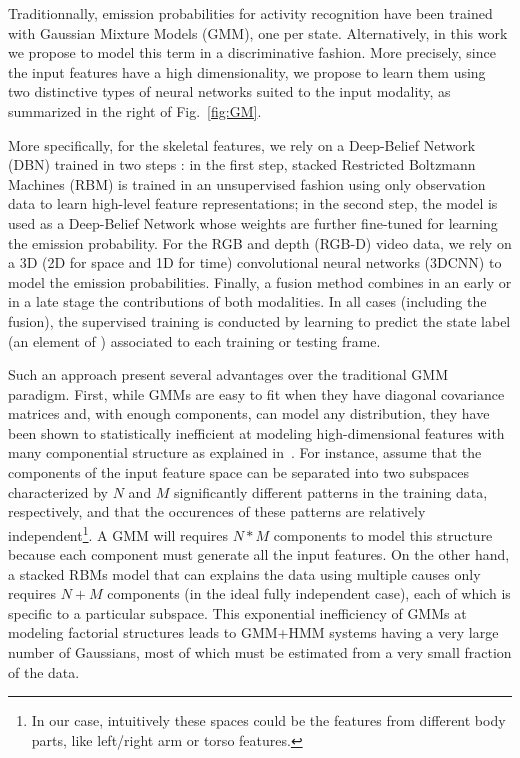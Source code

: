 Traditionnally, emission probabilities for activity recognition have been trained with Gaussian Mixture Models (GMM), one per state.
%
Alternatively, in this work we propose to model this term in a discriminative fashion.
More precisely, since the input features have a high dimensionality,
we propose to learn them using two distinctive types of neural networks suited to the input modality,
as summarized in the right of Fig.~\ref{fig:GM}.
%

More specifically, for  the skeletal features, we rely on a Deep-Belief Network (DBN) trained in two steps \cite{salakhutdinov2009learning}:
in the first step,  stacked Restricted Boltzmann Machines (RBM) is trained in an unsupervised fashion using only observation data
to learn  high-level feature representations;
in the second step, the model is used as a Deep-Belief Network whose weights are further fine-tuned
for learning the emission probability.
%
For the RGB and depth (RGB-D) video data, we rely on a 3D (2D for space and 1D for time)
convolutional neural networks (3DCNN) to model the emission probabilities.
%
Finally, a fusion method combines in an early or in a late stage the contributions of both modalities.
%
In all cases (including the fusion), the supervised training is conducted by learning to
predict the state label (an element of \finiteset) associated to each training or testing frame.


Such an approach present several advantages over the traditional GMM paradigm.
%
First, while  GMMs are easy to fit when they have diagonal covariance matrices and, with enough components,
can model any distribution, they have been shown to statistically inefficient at modeling high-dimensional features
with many componential structure as explained in~\cite{mohamed2012acoustic}.
%
For instance, assume that the components of the input feature space can be separated into two subspaces
characterized by  $N$  and $M$ significantly different  patterns in the training data, respectively, and that the occurences
of these patterns are relatively independent\footnote{In our case, intuitively these spaces could be the  features from different body parts,
like left/right arm or torso features.}.
%
A GMM will requires $N*M$ components to model this structure because each component must generate all the input features.
%
On the other hand, a stacked RBMs model that can explains the data using multiple causes only requires $N+M$ components
(in the ideal fully independent case), each of which is specific to a particular subspace.
%
This exponential inefficiency of GMMs at modeling factorial structures leads to GMM+HMM systems having
a very large number of Gaussians, most of which must be estimated from a very small fraction of the data.


